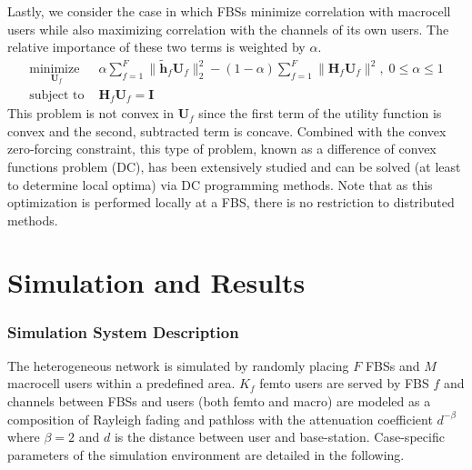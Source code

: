 \par
Lastly, we consider the case in which FBSs minimize correlation with macrocell users while also maximizing correlation with the channels of its own users. The relative importance of these two terms is weighted by $\alpha.$
    \begin{equation}
    \begin{array}{ll}
    \underset{\mathbf{U}_{f} }{\text{minimize }}   & \alpha\sum^F_{f=1} \|\tilde{\mathbf{h}}_{f}  \mathbf{U}_{f}\|^2_2
    -
    (1-\alpha)\sum^F_{f=1} \|\mathbf{H}_{f}  \mathbf{U}_{f}\|^2, \; 0\leq \alpha \leq 1
    \\
    \mbox{subject to } & \mathbf{H}_{f}  \mathbf{U}_{f} = \mathbf{I}
    \end{array}
    \label{e-opt-prob}
    \end{equation}
    This problem is not convex in $\mathbf{U}_{f}$ since the first term of the utility function is convex and the second, subtracted term is concave. Combined with the convex zero-forcing constraint, this type of problem, known as a difference of convex functions problem (DC), has been extensively studied and can be solved (at least to determine local optima) via DC programming methods. Note that as this optimization is performed locally at a FBS, there is no restriction to distributed methods.
     


\chapter{Simulation and Results}\label{numerical}
\subsection{Simulation System Description}
The heterogeneous network is simulated by randomly placing $F$ FBSs and $M$ macrocell users within a predefined area. $K_{f}$ femto users are served by FBS $f$ and channels between FBSs and users (both femto and macro) are modeled as a composition of Rayleigh fading and pathloss with the attenuation coefficient $d^{- \beta}$ where $\beta=2$ and $d$ is the distance between user and base-station. Case-specific parameters of the simulation environment are detailed in the following.


